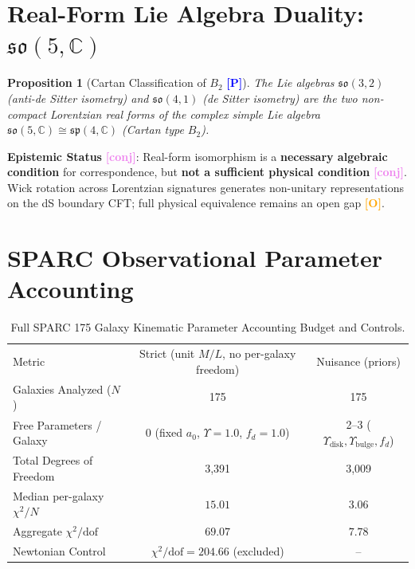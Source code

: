 \documentclass[aps,prd,twocolumn,superscriptaddress,nofootinbib,floatfix]{revtex4-2}
\newcommand{\tagP}{\textcolor{blue}{\textbf{[P]}}}
\newcommand{\tagC}{\textcolor{violet}{\textbf{[conj]}}}
\newcommand{\tagO}{\textcolor{orange}{\textbf{[O]}}}
\theoremstyle{plain}
\newtheorem{proposition}[theorem]{Proposition}
\theoremstyle{definition}
\begin{document}
\section{Real-Form Lie Algebra Duality: $\mathfrak{so}(5,\mathbb{C})$}
\label{sec:lie}

\begin{proposition}[Cartan Classification of $B_2$ \tagP]
\label{prop:lie_forms}
The Lie algebras $\mathfrak{so}(3,2)$ (anti-de Sitter isometry) and $\mathfrak{so}(4,1)$ (de Sitter isometry) are the two non-compact Lorentzian real forms of the complex simple Lie algebra $\mathfrak{so}(5,\mathbb{C}) \cong \mathfrak{sp}(4,\mathbb{C})$ (Cartan type $B_2$).
\end{proposition}
\noindent \textbf{Epistemic Status} \tagC: Real-form isomorphism is a \textbf{necessary algebraic condition} for correspondence, but \textbf{not a sufficient physical condition} \tagC. Wick rotation across Lorentzian signatures generates non-unitary representations on the dS boundary CFT; full physical equivalence remains an open gap \tagO.

\section{SPARC Observational Parameter Accounting}
\label{sec:sparc}

\begin{table}[h!]
\caption{Full SPARC 175 Galaxy Kinematic Parameter Accounting Budget and Controls.}
\label{tab:sparc}
\begin{ruledtabular}
\begin{tabular}{lcc}
Metric & Strict (unit $M/L$, no per-galaxy freedom) & Nuisance (priors) \\
\colrule
Galaxies Analyzed ($N$) & 175 & 175 \\
Free Parameters / Galaxy & 0 (fixed $a_0$, $\Upsilon=1.0$, $f_d=1.0$) & 2--3 ($\Upsilon_{\mathrm{disk}}, \Upsilon_{\mathrm{bulge}}, f_d$) \\
Total Degrees of Freedom & 3,391 & 3,009 \\
Median per-galaxy $\chi^2/N$ & $15.01$ & $3.06$ \\
Aggregate $\chi^2/\mathrm{dof}$ & $69.07$ & $7.78$ \\
Newtonian Control & $\chi^2/\mathrm{dof} = 204.66$ (excluded) & -- \\
\end{tabular}
\end{ruledtabular}
\end{table}
\end{document}
